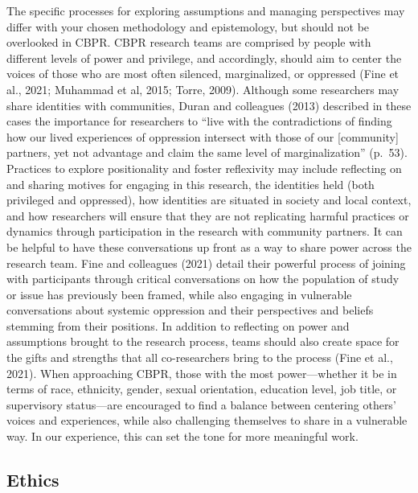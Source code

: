 \documentclass[
  11pt,
]{book}
\begin{document}
The specific processes for exploring assumptions and managing perspectives may differ with your chosen methodology and epistemology, but should not be overlooked in CBPR. CBPR research teams are comprised by people with different levels of power and privilege, and accordingly, should aim to center the voices of those who are most often silenced, marginalized, or oppressed (Fine et al., 2021; Muhammad et al, 2015; Torre, 2009). Although some researchers may share identities with communities, Duran and colleagues (2013) described in these cases the importance for researchers to ``live with the contradictions of finding how our lived experiences of oppression intersect with those of our {[}community{]} partners, yet not advantage and claim the same level of marginalization'' (p.~53). Practices to explore positionality and foster reflexivity may include reflecting on and sharing motives for engaging in this research, the identities held (both privileged and oppressed), how identities are situated in society and local context, and how researchers will ensure that they are not replicating harmful practices or dynamics through participation in the research with community partners. It can be helpful to have these conversations up front as a way to share power across the research team. Fine and colleagues (2021) detail their powerful process of joining with participants through critical conversations on how the population of study or issue has previously been framed, while also engaging in vulnerable conversations about systemic oppression and their perspectives and beliefs stemming from their positions. In addition to reflecting on power and assumptions brought to the research process, teams should also create space for the gifts and strengths that all co-researchers bring to the process (Fine et al., 2021). When approaching CBPR, those with the most power---whether it be in terms of race, ethnicity, gender, sexual orientation, education level, job title, or supervisory status---are encouraged to find a balance between centering others' voices and experiences, while also challenging themselves to share in a vulnerable way. In our experience, this can set the tone for more meaningful work.

\subsection{Ethics}\label{ethics}
\end{document}
